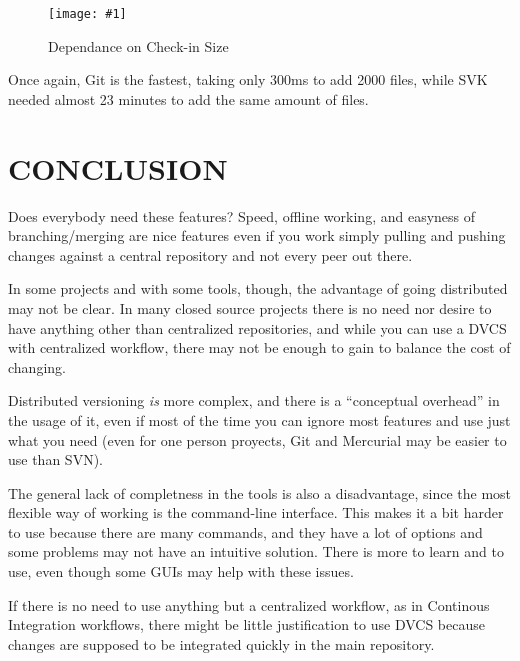 \documentclass[a4paper,10pt]{article}
\newcommand{\diagrama}[2]{
    \begin{figure}[h]
        \begin{center}
            \texttt{[image: \#1]} 
        \end{center}
        \caption{#2}
    \end{figure}
}
\begin{document}
\diagrama{dvcs_roundup_plot_steps1.jpg}{Dependance on Check-in Size}

Once again, Git is the fastest, taking only 300ms to add 2000 files, while SVK needed almost 23 minutes to add the same amount of files.

\section{CONCLUSION}

Does everybody need these features? Speed, offline working, 
and easyness of branching/merging are nice features even if you work simply pulling 
and pushing changes against a central repository and not every peer out there. 

In some projects and with some tools, though, the advantage of going distributed may not be clear. 
In many closed source projects there is no need nor desire to have anything
other than centralized repositories, and while you can use a DVCS with centralized
workflow, there may not be enough to gain to balance the cost of changing.

Distributed versioning \emph{is} more complex, and there is a ``conceptual overhead'' in the usage 
of it, even if most of the time you can ignore most features and use just what you need 
(even for one person proyects, Git and Mercurial may be easier to use than SVN).

The general lack of completness in the tools is also a disadvantage, since the most flexible
way of working is the command-line interface. This makes it a bit harder to use because there 
are many commands, and they have a lot of options and some problems may not have an intuitive 
solution. There is more to learn and to use, even though some GUIs may help with these issues.

If there is no need to use anything but a centralized workflow, as in Continous Integration 
workflows, there might be little justification to use DVCS because changes are supposed to be 
integrated quickly in the main repository.
\end{document}
